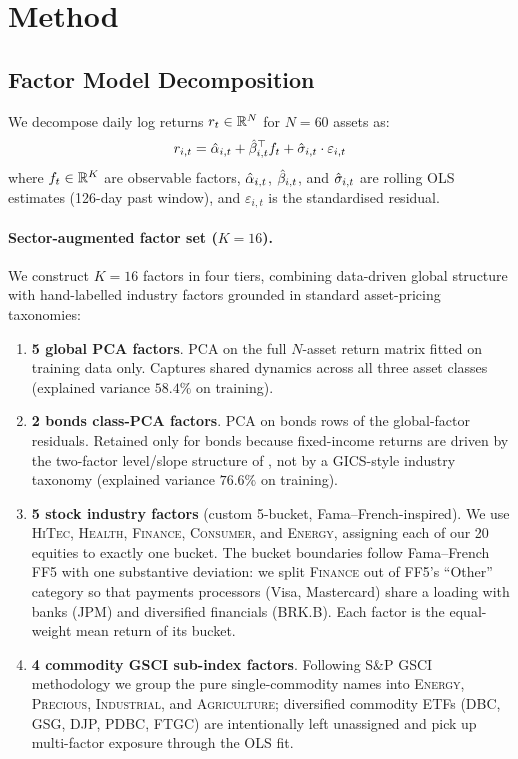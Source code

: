 \section{Method}
\label{sec:method}

\subsection{Factor Model Decomposition}

We decompose daily log returns $r_t \in \mathbb{R}^N$ for $N=60$ assets as:
\begin{equation}
    r_{i,t} = \hat{\alpha}_{i,t} + \hat{\beta}_{i,t}^\top f_t + \hat{\sigma}_{i,t} \cdot \varepsilon_{i,t}
    \label{eq:factor_model}
\end{equation}
where $f_t \in \mathbb{R}^K$ are observable factors, $\hat{\alpha}_{i,t}$, $\hat{\beta}_{i,t}$, and $\hat{\sigma}_{i,t}$ are rolling OLS estimates (126-day past window), and $\varepsilon_{i,t}$ is the standardised residual.

\paragraph{Sector-augmented factor set ($K=16$).}
We construct $K=16$ factors in four tiers, combining data-driven global structure with hand-labelled industry factors grounded in standard asset-pricing taxonomies:
\begin{enumerate}
\item \textbf{5 global PCA factors}. PCA on the full $N$-asset return matrix fitted on training data only. Captures shared dynamics across all three asset classes (explained variance $58.4\%$ on training).
\item \textbf{2 bonds class-PCA factors}. PCA on bonds rows of the global-factor residuals. Retained only for bonds because fixed-income returns are driven by the two-factor level/slope structure of \citet{litterman1991common}, not by a GICS-style industry taxonomy (explained variance $76.6\%$ on training).
\item \textbf{5 stock industry factors} (custom 5-bucket, Fama--French-inspired). We use \textsc{HiTec}, \textsc{Health}, \textsc{Finance}, \textsc{Consumer}, and \textsc{Energy}, assigning each of our 20 equities to exactly one bucket. The bucket boundaries follow Fama--French FF5 with one substantive deviation: we split \textsc{Finance} out of FF5's ``Other'' category so that payments processors (Visa, Mastercard) share a loading with banks (JPM) and diversified financials (BRK.B). Each factor is the equal-weight mean return of its bucket.
\item \textbf{4 commodity GSCI sub-index factors}. Following S\&P GSCI methodology we group the pure single-commodity names into \textsc{Energy}, \textsc{Precious}, \textsc{Industrial}, and \textsc{Agriculture}; diversified commodity ETFs (DBC, GSG, DJP, PDBC, FTGC) are intentionally left unassigned and pick up multi-factor exposure through the OLS fit.
\end{enumerate}

